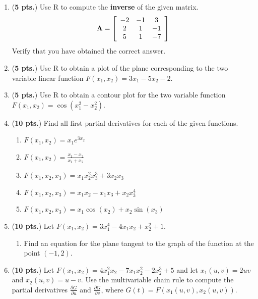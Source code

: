 \documentclass[13pt]{article}\usepackage[]{graphicx}\usepackage[]{color}
\begin{document}
{\begin{enumerate}
 \item ({\bf 5 pts.}) Use R to compute the {\bf inverse} of the given matrix. 
 \[ {\bf A} = \left[\begin{array}{ccc} -2 & -1 & 3 \\ 2 & 1 & -1 \\ 5 & 1 & -7 \end{array} \right]\]
 Verify that you have obtained the correct answer. 
 
 \newpage 
 
 \item ({\bf 5 pts.}) Use R to obtain a plot of the plane corresponding to the two variable linear function $F(x_{1},x_{2}) = 3x_{1} - 5x_{2} - 2$.
 
 \vspace{2.5in}
 
\item ({\bf 5 pts.}) Use R to obtain a contour plot for the two variable function $F(x_{1},x_{2}) = \cos(x_{1}^{2} - x_{2}^{2})$. 

\newpage

\item ({\bf 10 pts.}) Find all first partial derivatives for each of the given functions.
  \begin{enumerate}
       \item $F(x_{1},x_{2}) = x_{1}e^{3x_{2}}$
        \item $F(x_{1},x_{2}) = \frac{x_{1} - x_{2}}{x_{1} + x_{2}}$
          \item $F(x_{1},x_{2},x_{3}) = x_{1}x_{2}^{2}x_{3}^{3} + 3x_{2}x_{3}$
           \item $F(x_{1},x_{2},x_{3}) = x_{1}x_{2} - x_{1}x_{3} + x_{2}x_{3}^{4}$
            \item $F(x_{1},x_{2},x_{3}) = x_{1}\cos(x_{2}) + x_{2}\sin(x_{3})$
  \end{enumerate}
  
  \newpage
  
  \item ({\bf 10 pts.}) Let $F(x_{1},x_{2}) = 3x_{1}^4 - 4x_{1}x_{2} + x_{2}^{2} + 1$. 
  \begin{enumerate}
      \item Find an equation for the plane tangent to the graph of the function at the point $(-1,2)$.
  \end{enumerate}
  
  \vspace{2.5in}
  
   \item ({\bf 10 pts.})  Let $F(x_{1},x_{2}) = 4x_{1}^2 x_{2} - 7x_{1} x_{2}^2 - 2x_{2}^{3} + 5$ and let $x_{1}(u,v) = 2uv$ and $x_{2}(u,v) = u-v$. Use the multivariable chain rule to compute the partial derivatives $\frac{\partial G}{\partial u}$ and $\frac{\partial G}{\partial v}$, where $G(t) = F(x_{1}(u,v),x_{2}(u,v))$.
   

\end{enumerate}}
\end{document}
